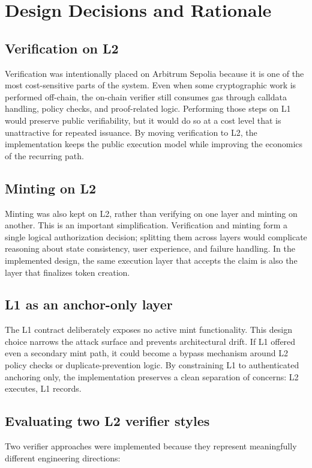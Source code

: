\documentclass[11pt]{article}
\begin{document}
\section{Design Decisions and Rationale}

\subsection{Verification on L2}
Verification was intentionally placed on Arbitrum Sepolia because it is one of the most cost-sensitive parts of the system. Even when some cryptographic work is performed off-chain, the on-chain verifier still consumes gas through calldata handling, policy checks, and proof-related logic. Performing those steps on L1 would preserve public verifiability, but it would do so at a cost level that is unattractive for repeated issuance. By moving verification to L2, the implementation keeps the public execution model while improving the economics of the recurring path.

\subsection{Minting on L2}
Minting was also kept on L2, rather than verifying on one layer and minting on another. This is an important simplification. Verification and minting form a single logical authorization decision; splitting them across layers would complicate reasoning about state consistency, user experience, and failure handling. In the implemented design, the same execution layer that accepts the claim is also the layer that finalizes token creation.

\subsection{L1 as an anchor-only layer}
The L1 contract deliberately exposes no active mint functionality. This design choice narrows the attack surface and prevents architectural drift. If L1 offered even a secondary mint path, it could become a bypass mechanism around L2 policy checks or duplicate-prevention logic. By constraining L1 to authenticated anchoring only, the implementation preserves a clean separation of concerns: L2 executes, L1 records.

\subsection{Evaluating two L2 verifier styles}
Two verifier approaches were implemented because they represent meaningfully different engineering directions:
\end{document}
